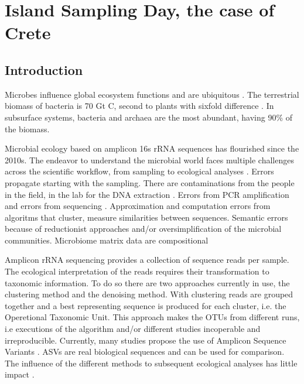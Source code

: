 % 
% 


\chapter{Island Sampling Day, the case of Crete}
\label{cha:isd-crete-soil}


\section{Introduction}\label{intro}

Microbes influence global ecosystem functions \parencite{falkowski2008microbial}
and are ubiquitous \parencite{delgado2016microbial}. The terrestrial biomass of bacteria is
70 Gt C, second to plants with sixfold difference \parencite{bar2018biomass}. In subsurface systems, bacteria and
archaea are the most abundant, having 90\% of the biomass.

Microbial ecology based on amplicon 16s rRNA sequences has flourished since the
2010s. The endeavor to understand the microbial world faces multiple challenges
across the scientific workflow, from sampling to ecological analyses \parencite{Lee2012}.
Errors propagate starting with the sampling. There are contaminations from the
people in the field, in the lab for the DNA extraction \parencite{EISENHOFER2019105}. 
Errors from PCR amplification and errors from sequencing \parencite{Schloss2011, Schimer2015}.
Approximation and computation errors from algoritms that cluster, measure similarities between
sequences. Semantic errors because of reductionist approaches and/or oversimplification
of the microbial communities. Microbiome matrix data are compositional \parencite{Gloor2017}

Amplicon rRNA sequencing provides a collection of sequence reads per sample. 
The ecological interpretation of the reads requires their transformation to
taxonomic information. To do so there are two approaches currently in use, 
the clustering method and the denoising method. With clustering reads are 
grouped together and a best representing sequence is produced for each 
cluster, i.e. the Operetional Taxonomic Unit. This approach makes the OTUs 
from different runs, i.e executions of the algorithm and/or different studies
incoperable and irreproducible. Currently, many studies propose the use of Amplicon Sequence Variants \parencite{Callahan2017}. 
ASVs are real biological sequences and can be used for comparison.
The influence of the different methods to subsequent ecological analyses has
little impact \parencite{Glassman2018}.




